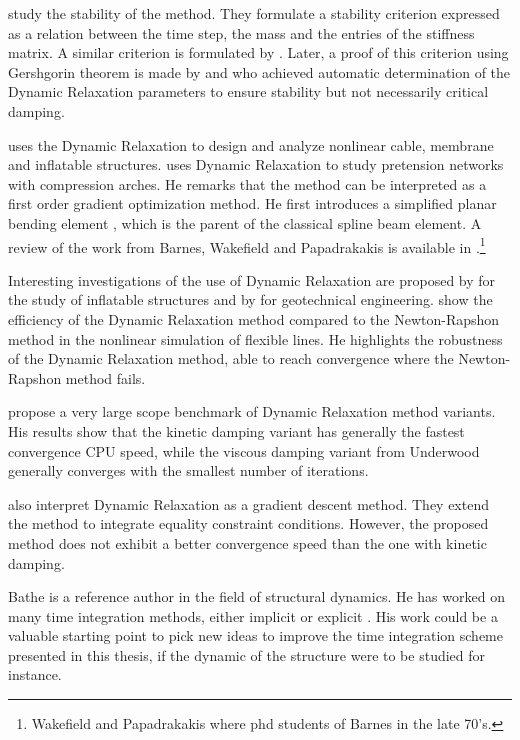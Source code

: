 study the stability of the method. They formulate a stability criterion expressed as a relation between the time step, the mass and the entries of the stiffness matrix. A similar criterion is formulated by . Later, a proof of this criterion using Gershgorin theorem is made by  and  who achieved automatic determination of the Dynamic Relaxation parameters to ensure stability but not necessarily critical damping.

 uses the Dynamic Relaxation to design and analyze nonlinear cable, membrane and inflatable structures.  uses Dynamic Relaxation to study pretension networks with compression arches. He remarks that the method can be interpreted as a first order gradient optimization method. He first introduces a simplified planar bending element \cite[p.~120]{Wakefield1980}, which is the parent of the classical  spline beam element. A review of the work from Barnes, Wakefield and Papadrakakis is available in \cite{Barnes1999}.\footnote{Wakefield and Papadrakakis where phd students of Barnes in the late 70's.}

Interesting investigations of the use of Dynamic Relaxation are proposed by \cite{Rodriguez2011a} for the study of inflatable structures and by  for geotechnical engineering.  show the efficiency of the Dynamic Relaxation method compared to the Newton-Rapshon method in the nonlinear simulation of flexible lines. He highlights the robustness of the Dynamic Relaxation method, able to reach convergence where the Newton-Rapshon method fails.

 propose a very large scope benchmark of Dynamic Relaxation method variants. His results show that the kinetic damping variant \cite{Topping2007} has generally the fastest convergence CPU speed, while the viscous damping variant from Underwood \cite{Underwood1983} generally converges with the smallest number of iterations.

 also interpret Dynamic Relaxation as a gradient descent method. They extend the method to integrate equality constraint conditions. However, the proposed method does not exhibit a better convergence speed than the one with kinetic damping.

Bathe is a reference author in the field of structural dynamics. He has worked on many time integration methods, either implicit or explicit \cite{Noh2013}. His work could be a valuable starting point to pick new ideas to improve the time integration scheme presented in this thesis, if the dynamic of the structure were to be studied for instance.

